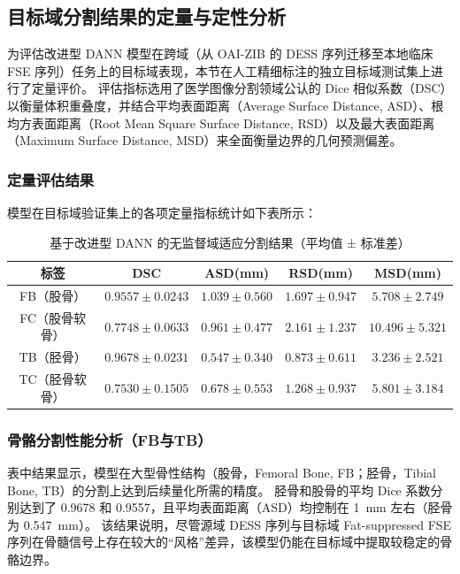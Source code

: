   \subsection{目标域分割结果的定量与定性分析}
    为评估改进型 DANN 模型在跨域（从 OAI-ZIB 的 DESS 序列迁移至本地临床 FSE 序列）任务上的目标域表现，本节在人工精细标注的独立目标域测试集上进行了定量评价。
    评估指标选用了医学图像分割领域公认的 Dice 相似系数（DSC）以衡量体积重叠度，并结合平均表面距离（Average Surface Distance, ASD）、根均方表面距离（Root Mean Square Surface Distance, RSD）以及最大表面距离（Maximum Surface Distance, MSD）来全面衡量边界的几何预测偏差。
    \subsubsection{定量评估结果}
      模型在目标域验证集上的各项定量指标统计如下表所示：
      \begin{table}[!hpt]
        \caption{基于改进型 DANN 的无监督域适应分割结果（平均值 ± 标准差）}
        \label{tab:dann_results}
        \centering
        \begin{tabular}{ccccc}
          \toprule
            标签 & DSC & ASD(mm) & RSD(mm) & MSD(mm) \\
          \midrule
            FB（股骨） & $0.9557 \pm 0.0243$ & $1.039 \pm 0.560$ & $1.697 \pm 0.947$ & $5.708 \pm 2.749$ \\
            FC（股骨软骨） & $0.7748 \pm 0.0633$ & $0.961 \pm 0.477$ & $2.161 \pm 1.237$ & $10.496 \pm 5.321$ \\
            TB（胫骨） & $0.9678 \pm 0.0231$ & $0.547 \pm 0.340$ & $0.873 \pm 0.611$ & $3.236 \pm 2.521$ \\
            TC（胫骨软骨） & $0.7530 \pm 0.1505$ & $0.678 \pm 0.553$ & $1.268 \pm 0.937$ & $5.801 \pm 3.184$ \\
          \bottomrule
        \end{tabular}
      \end{table}
    \subsubsection{骨骼分割性能分析（FB与TB）}
      表中结果显示，模型在大型骨性结构（股骨，Femoral Bone, FB；胫骨，Tibial Bone, TB）的分割上达到后续量化所需的精度。
      胫骨和股骨的平均 Dice 系数分别达到了 \num{0.9678} 和 \num{0.9557}，且平均表面距离（ASD）均控制在 \qty{1}{\milli\metre} 左右（胫骨为 \qty{0.547}{\milli\metre}）。
      该结果说明，尽管源域 DESS 序列与目标域 Fat-suppressed FSE 序列在骨髓信号上存在较大的“风格”差异，该模型仍能在目标域中提取较稳定的骨骼边界。
